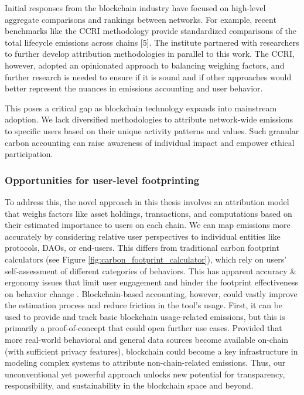 \documentclass[11pt]{report}
\begin{document}
Initial responses from the blockchain industry have focused on high-level aggregate comparisons and rankings between networks. For example, recent benchmarks like the \ac{CCRI} methodology provide standardized comparisons of the total lifecycle emissions across chains [5]. The institute partnered with researchers to further develop attribution methodologies in parallel to this work. The CCRI, however, adopted an opinionated approach to balancing weighing factors, and further research is needed to ensure if it is sound and if other approaches would better represent the nuances in emissions accounting and user behavior.

This poses a critical gap as blockchain technology expands into mainstream adoption. We lack diversified methodologies to attribute network-wide emissions to specific users based on their unique activity patterns and values. Such granular carbon accounting can raise awareness of individual impact and empower ethical participation.

\subsubsection*{Opportunities for user-level footprinting}

To address this, the novel approach in this thesis involves an attribution model that weighs factors like asset holdings, transactions, and computations based on their estimated importance to users on each chain. We can map emissions more accurately by considering relative user perspectives to individual entities like protocols, DAOs, or end-users. This differs from traditional carbon footprint calculators (see Figure \ref{fig:carbon_footprint_calculator}), which rely on users' self-assessment of different categories of behaviors. This has apparent accuracy \& ergonomy issues that limit user engagement and hinder the footprint effectiveness on behavior change \cite{saloOpportunitiesLimitationsCarbon2019,mulrowStateCarbonFootprint2019}. Blockchain-based accounting, however, could vastly improve the estimation process and reduce friction in the tool's usage. First, it can be used to provide and track basic blockchain usage-related emissions, but this is primarily a proof-of-concept that could open further use cases. Provided that more real-world behavioral and general data sources become available on-chain (with sufficient privacy features), blockchain could become a key infrastructure in modeling complex systems to attribute non-chain-related emissions. Thus, our unconventional yet powerful approach unlocks new potential for transparency, responsibility, and sustainability in the blockchain space and beyond.
\end{document}
